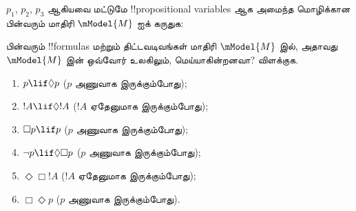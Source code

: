 \documentclass[../../../include/open-logic-section]{subfiles}
\begin{document}
\begin{prob}
  $p_1$, $p_2$, $p_3$ ஆகியவை மட்டுமே !!{propositional variable}s ஆக
  அமைந்த மொழிக்கான பின்வரும் மாதிரி $\mModel{M}$ ஐக் கருதுக:
  \begin{center}
  \end{center}
  பின்வரும் !!{formula}s மற்றும் திட்டவடிவங்கள் மாதிரி $\mModel{M}$ இல்,
  அதாவது $\mModel{M}$ இன் ஒவ்வோர் உலகிலும், மெய்யாகின்றனவா? விளக்குக.
  \begin{enumerate}
  \item $p\lif \Diamond p$ ($p$ அணுவாக இருக்கும்போது);
  \item $!A\lif \Diamond !A$ ($!A$ ஏதேனுமாக இருக்கும்போது);
  \item $\Box p \lif p$ ($p$ அணுவாக இருக்கும்போது);
  \item $\lnot p \lif \Diamond \Box p$ ($p$ அணுவாக இருக்கும்போது);
  \item $\Diamond \Box !A$ ($!A$ ஏதேனுமாக இருக்கும்போது);
  \item $\Box \Diamond p$ ($p$ அணுவாக இருக்கும்போது).
  \end{enumerate}
\end{prob}
\end{document}
